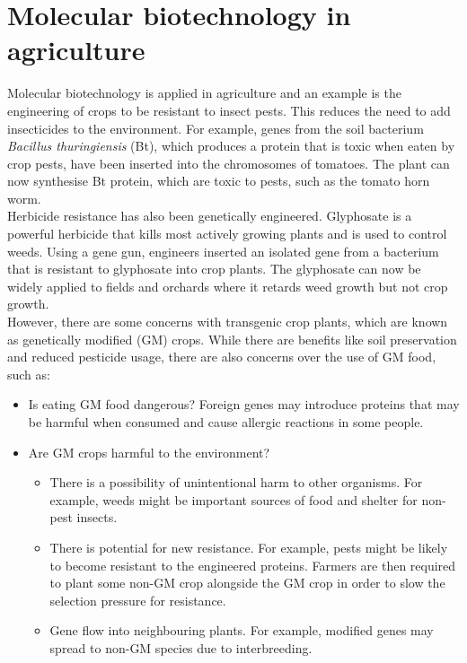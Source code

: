 \documentclass[11pt]{article}
\begin{document}
\newpage

\section{Molecular biotechnology in agriculture}
\label{sec:org79ac129}
Molecular biotechnology is applied in agriculture and an example is the engineering of crops to be resistant to insect pests. This reduces the need to add insecticides to the environment. For example, genes from the soil bacterium \emph{Bacillus thuringiensis} (Bt), which produces a protein that is toxic when eaten by crop pests, have been inserted into the chromosomes of tomatoes. The plant can now synthesise Bt protein, which are toxic to pests, such as the tomato horn worm.
\\[0pt]

Herbicide resistance has also been genetically engineered. Glyphosate is a powerful herbicide that kills most actively growing plants and is used to control weeds. Using a gene gun, engineers inserted an isolated gene from a bacterium that is resistant to glyphosate into crop plants. The glyphosate can now be widely applied to fields and orchards where it retards weed growth but not crop growth.
\\[0pt]

However, there are some concerns with transgenic crop plants, which are known as genetically modified (GM) crops. While there are benefits like soil preservation and reduced pesticide usage, there are also concerns over the use of GM food, such as:
\begin{itemize}
\item Is eating GM food dangerous? Foreign genes may introduce proteins that may be harmful when consumed and cause allergic reactions in some people.
\item Are GM crops harmful to the environment?
\begin{itemize}
\item There is a possibility of unintentional harm to other organisms. For example, weeds might be important sources of food and shelter for non-pest insects.
\item There is potential for new resistance. For example, pests might be likely to become resistant to the engineered proteins. Farmers are then required to plant some non-GM crop alongside the GM crop in order to slow the selection pressure for resistance.
\item Gene flow into neighbouring plants. For example, modified genes may spread to non-GM species due to interbreeding.
\end{itemize}
\end{itemize}
\end{document}
